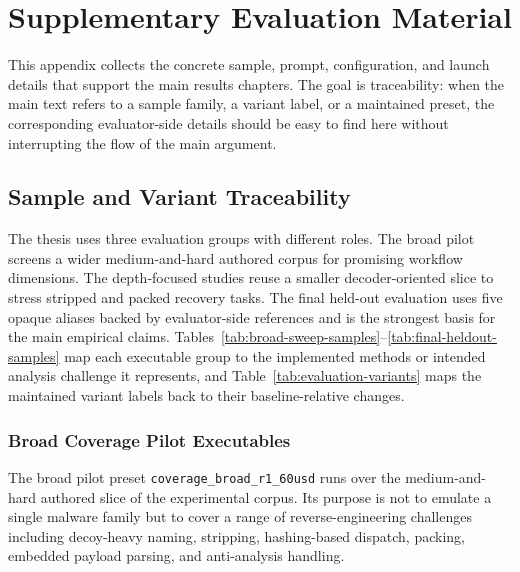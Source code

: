 \chapter{Supplementary Evaluation Material}

This appendix collects the concrete sample, prompt, configuration, and launch details that support the main results chapters. The goal is traceability: when the main text refers to a sample family, a variant label, or a maintained preset, the corresponding evaluator-side details should be easy to find here without interrupting the flow of the main argument.

\section{Sample and Variant Traceability}
\label{app:sample-variant-traceability}

The thesis uses three evaluation groups with different roles. The broad pilot screens a wider medium-and-hard authored corpus for promising workflow dimensions. The depth-focused studies reuse a smaller decoder-oriented slice to stress stripped and packed recovery tasks. The final held-out evaluation uses five opaque aliases backed by evaluator-side references and is the strongest basis for the main empirical claims. Tables~\ref{tab:broad-sweep-samples}--\ref{tab:final-heldout-samples} map each executable group to the implemented methods or intended analysis challenge it represents, and Table~\ref{tab:evaluation-variants} maps the maintained variant labels back to their baseline-relative changes.

\subsection{Broad Coverage Pilot Executables}

The broad pilot preset \texttt{coverage\_broad\_r1\_60usd} runs over the medium-and-hard authored slice of the experimental corpus. Its purpose is not to emulate a single malware family but to cover a range of reverse-engineering challenges including decoy-heavy naming, stripping, hashing-based dispatch, packing, embedded payload parsing, and anti-analysis handling.

